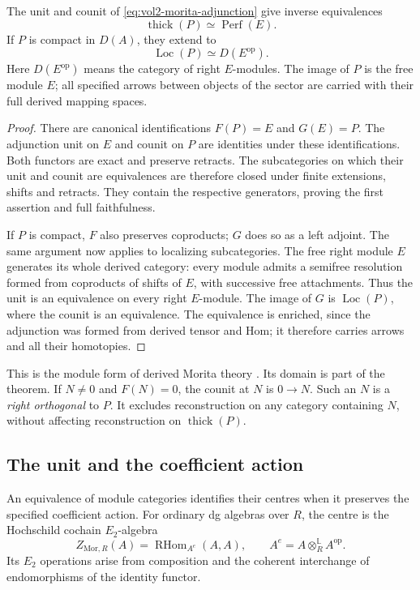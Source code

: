 \begin{theorem}
\label{thm:vol2-marked-morita}
The unit and counit of \eqref{eq:vol2-morita-adjunction} give
inverse equivalences
\[
 \operatorname{thick}(P)\simeq\operatorname{Perf}(E).
\]
If \(P\) is compact in \(D(A)\), they extend to
\[
 \operatorname{Loc}(P)\simeq D(E^{\mathrm{op}}).
\]
Here \(D(E^{\mathrm{op}})\) means the category of right
\(E\)-modules. The image of \(P\) is the free module \(E\);
all specified arrows between objects of the sector are carried
with their full derived mapping spaces.
\end{theorem}
\begin{proof}
There are canonical identifications \(F(P)=E\) and \(G(E)=P\).
The adjunction unit on \(E\) and counit on \(P\) are identities
under these identifications. Both functors are exact and preserve
retracts. The subcategories on which their unit and counit are
equivalences are therefore closed under finite extensions, shifts
and retracts. They contain the respective generators, proving
the first assertion and full faithfulness.

If \(P\) is compact, \(F\) also preserves coproducts; \(G\)
does so as a left adjoint. The same argument now applies to
localizing subcategories. The free right module \(E\) generates
its whole derived category: every module admits a semifree
resolution formed from coproducts of shifts of \(E\), with
successive free attachments. Thus the unit is an equivalence
on every right \(E\)-module. The image of \(G\) is
\(\operatorname{Loc}(P)\), where the counit is an equivalence.
The equivalence is enriched, since the adjunction was formed
from derived tensor and Hom; it therefore carries arrows and
all their homotopies.
\end{proof}

This is the module form of derived Morita theory
\cite{KellerDG2006}. Its domain is part of the theorem. If
\(N\ne0\) and \(F(N)=0\), the counit at \(N\) is \(0\to N\).
Such an \(N\) is a \emph{right orthogonal} to \(P\).
It excludes reconstruction on any category containing \(N\),
without affecting reconstruction on \(\operatorname{thick}(P)\).

\subsection{The unit and the coefficient action}

An equivalence of module categories identifies their centres
when it preserves the specified coefficient action. For ordinary
dg algebras over \(R\), the centre is the Hochschild cochain
\(E_2\)-algebra
\[
 Z_{\mathrm{Mor},R}(A)=\operatorname{RHom}_{A^e}(A,A),
 \qquad A^e=A\otimes_R^{\mathbb L}A^{\mathrm{op}}.
\]
Its \(E_2\) operations arise from composition and the coherent
interchange of endomorphisms of the identity functor.

